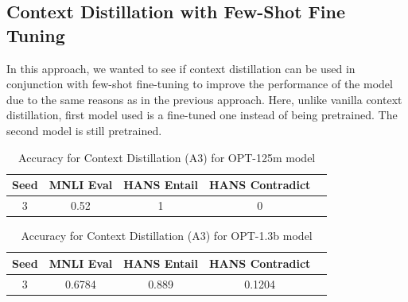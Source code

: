 \documentclass[10pt,twocolumn,letterpaper]{article}
\begin{document}
\subsection{Context Distillation with Few-Shot Fine Tuning}
In this approach, we wanted to see if context distillation can be used in conjunction with few-shot fine-tuning to improve the performance of the model due to the same reasons as
in the previous approach. Here, unlike vanilla context distillation, first model used is a fine-tuned one instead of being pretrained. The second model is still pretrained.

		
		
		
		
		
		

\begin{table}[h!]
\begin{center}
\begin{tabular}{|c|c|c|c|c|}
\hline
\textbf{Seed} & \textbf{MNLI Eval} & \textbf{HANS Entail} & \textbf{HANS Contradict} \\
\hline
\hline
3 & 0.52 & 1 & 0 \\
\hline
\end{tabular}
\end{center}
\caption{Accuracy for Context Distillation (A3) for OPT-125m model}
\end{table}

\begin{table}[h!]
\begin{center}
\begin{tabular}{|c|c|c|c|c|}
\hline
\textbf{Seed} & \textbf{MNLI Eval} & \textbf{HANS Entail} & \textbf{HANS Contradict} \\
\hline
\hline
3 & 0.6784 & 0.889 & 0.1204 \\
\hline
\end{tabular}
\end{center}
\caption{Accuracy for Context Distillation (A3) for OPT-1.3b model}
\end{table}

			
			
\end{document}
